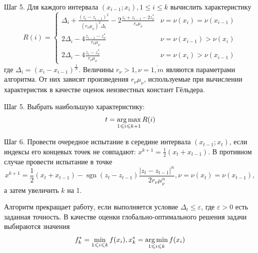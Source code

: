 Шаг 5. Для каждого интервала \((x_{i-1};x_{i}),1\leqslant i\leqslant k\) вычислить характеристику
\begin{equation}
  \label{step3_1}
  R(i)={\begin{cases}\Delta _{i}+{\frac {(z_{i}-z_{i-1})^{2}}{(r_{\nu }\mu _{\nu })^{2}\Delta _{i}}}-2{\frac {z_{i}+z_{i-1}-2z_{\nu }^{*}}{r_{\nu }\mu _{\nu }}}&\nu =\nu (x_{i})=\nu (x_{i-1})\\2\Delta _{i}-4{\frac {z_{i-1}-z_{\nu }^{*}}{r_{\nu }\mu _{\nu }}}&\nu =\nu (x_{i-1})>\nu (x_{i})\\2\Delta _{i}-4{\frac {z_{i}-z_{\nu }^{*}}{r_{\nu }\mu _{\nu }}}&\nu =\nu (x_{i})>\nu (x_{i-1})\end{cases}}
\end{equation}
где \(\Delta _{i}=(x_{i}-x_{i-1})^{\frac{1}{N}}\). Величины \(r_{\nu }>1,\nu ={\overline {1,m}}\)
являются параметрами алгоритма. От них зависят произведения \(r_{\nu }\mu _{\nu }\),
используемые при вычислении характеристик в качестве оценок неизвестных констант Гёльдера.

Шаг 5. Выбрать наибольшую характеристику:
\begin{equation}
\label{step4}
t=\operatorname*{arg\,max}_{1\leqslant i \leqslant k+1}R(i)
\end{equation}

Шаг 6. Провести очередное испытание в середине интервала \((x_{t-1};x_{t})\),
если индексы его концевых точек не совпадают: \(x^{k+1}={\frac {1}{2}}(x_{t}+x_{t-1})\).
В противном случае провести испытание в точке
\begin{displaymath}
  x^{k+1}={\frac {1}{2}}(x_{t}+x_{t-1})-\operatorname {sgn}(z_{t}-z_{t-1}){\frac {|z_{t}-z_{t-1}|^{n}}{2r_{\nu }\mu _{\nu }^{n}}},\nu =\nu (x_{t})=\nu (x_{t-1}),
\end{displaymath}
а затем увеличить \(k\) на 1.

Алгоритм прекращает работу, если выполняется условие \(\Delta_{t}\leqslant \varepsilon\),
где \(\varepsilon>0\) есть заданная точность. В качестве оценки глобально-оптимального решения задачи  выбираются значения
\begin{equation}
f_k^*=\min_{1\leqslant i \leqslant k}f(x_i), x_k^*=\operatorname*{arg\,min}_{1\leqslant i \leqslant k}f(x_i)
\end{equation}


